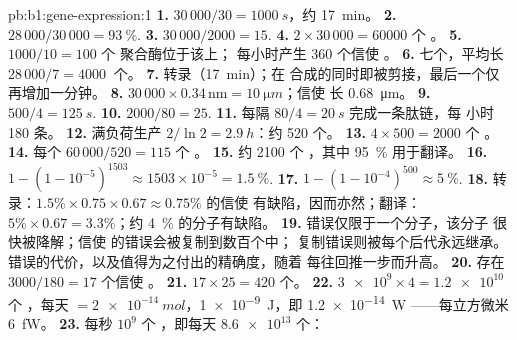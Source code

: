 \begin{solution}{pb:b1:gene-expression:1}
\textbf{1.} $30\,000/30 = \qty{1000}{s}$，约 \qty{17}{min}。
\textbf{2.} $28\,000/30\,000 = \qty{93}{\%}$.
\textbf{3.} $30\,000/2000 = 15$.
\textbf{4.} $2\times 30\,000 = \num{60000}$ 个 。
\textbf{5.} $1000/10 = 100$ 个  聚合酶位于该上；
每小时产生 360 个信使 。
\textbf{6.} 七个，平均长 $28\,000/7 = \qty{4000}{}$ 个。
\textbf{7.} 转录（\qty{17}{min}）；在
合成的同时即被剪接，最后一个仅再增加一分钟。
\textbf{8.}  $30\,000\times 0.34\,\mathrm{nm} = \qty{10}{\micro m}$；信使  长 \qty{0.68}{\micro m}。
\textbf{9.} $500/4 = \qty{125}{s}$.
\textbf{10.} $2000/80 = 25$.
\textbf{11.} 每隔 $80/4 = \qty{20}{s}$ 完成一条肽链，每
小时 180 条。
\textbf{12.} 满负荷生产 $2/\ln 2 = \qty{2.9}{h}$：约 520
个。
\textbf{13.} $4\times 500 = 2000$ 个 。
\textbf{14.} 每个 $60\,000/520 = 115$ 个 。
\textbf{15.} 约 2100 个 ，其中 \qty{95}{\%} 用于翻译。
\textbf{16.} $1 - (1 - 10^{-5})^{1503} \approx 1503\times 10^{-5} =
\qty{1.5}{\%}$.
\textbf{17.} $1 - (1 - 10^{-4})^{500} \approx \qty{5}{\%}$.
\textbf{18.} 转录：$1.5\%\times 0.75\times 0.67 \approx
0.75\%$ 的信使  有缺陷，因而亦然；翻译：
$5\%\times 0.67 = 3.3\%$；约 \qty{4}{\%} 的分子有缺陷。
\textbf{19.} 错误仅限于一个分子，该分子
很快被降解；信使  的错误会被复制到数百个中；
复制错误则被每个后代永远继承。
错误的代价，以及值得为之付出的精确度，随着
每往回推一步而升高。
\textbf{20.} 存在 $3000/180 = 17$ 个信使 。
\textbf{21.} $17\times 25 = 420$ 个。
\textbf{22.} $\num{3e9}\times 4 = \num{1.2e10}$ 个 ，每天
$= \qty{2e-14}{mol}$，\qty{1e-9}{J}，即 \qty{1.2e-14}{W}
——每立方微米 \qty{6}{fW}。
\textbf{23.} 每秒 $10^9$ 个 ，即每天 $\num{8.6e13}$ 个：

\end{solution}
